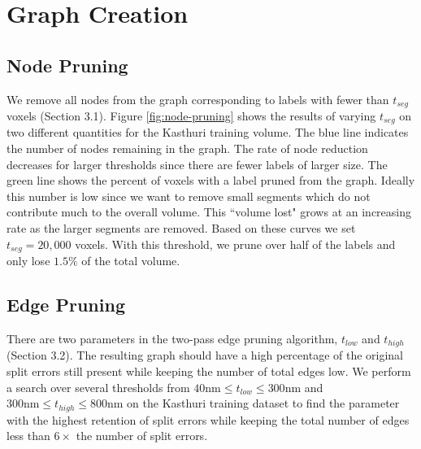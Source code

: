 
\section{Graph Creation}

\subsection{Node Pruning}

We remove all nodes from the graph corresponding to labels with fewer than $t_{seg}$ voxels (Section 3.1).
Figure \ref{fig:node-pruning} shows the results of varying $t_{seg}$ on two different quantities for the Kasthuri training volume. 
The blue line indicates the number of nodes remaining in the graph.
The rate of node reduction decreases for larger thresholds since there are fewer labels of larger size. 
The green line shows the percent of voxels with a label pruned from the graph.
Ideally this number is low since we want to remove small segments which do not contribute much to the overall volume.
This ``volume lost" grows at an increasing rate as the larger segments are removed. 
Based on these curves we set $t_{seg} = 20,000$ voxels.
With this threshold, we prune over half of the labels and only lose $1.5\%$ of the total volume.

\subsection{Edge Pruning}

There are two parameters in the two-pass edge pruning algorithm, $t_{low}$ and $t_{high}$ (Section 3.2). 
The resulting graph should have a high percentage of the original split errors still present while keeping the number of total edges low. 
We perform a search over several thresholds from $40\textrm{nm} \leq t_{low} \leq 300 \textrm{nm}$ and $300 \textrm{nm} \leq t_{high} \leq 800 \textrm{nm}$ on the Kasthuri training dataset to find the parameter with the highest retention of split errors while keeping the total number of edges less than $6 \times$ the number of split errors. 

